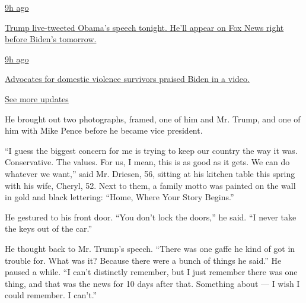 \href{https://www.nytimes3xbfgragh.onion/live/2020/08/19/us/dnc-convention-election?action=click\&pgtype=Article\&state=default\&region=MAIN_CONTENT_1\&context=storylines_live_updates\#trump-live-tweeted-obamas-speech-tonight-hell-appear-on-fox-news-right-before-bidens-tomorrow}{9h
ago}

\href{https://www.nytimes3xbfgragh.onion/live/2020/08/19/us/dnc-convention-election?action=click\&pgtype=Article\&state=default\&region=MAIN_CONTENT_1\&context=storylines_live_updates\#trump-live-tweeted-obamas-speech-tonight-hell-appear-on-fox-news-right-before-bidens-tomorrow}{Trump
live-tweeted Obama's speech tonight. He'll appear on Fox News right
before Biden's tomorrow.}

\href{https://www.nytimes3xbfgragh.onion/live/2020/08/19/us/dnc-convention-election?action=click\&pgtype=Article\&state=default\&region=MAIN_CONTENT_1\&context=storylines_live_updates\#advocates-for-domestic-violence-survivors-praised-biden-in-a-video}{9h
ago}

\href{https://www.nytimes3xbfgragh.onion/live/2020/08/19/us/dnc-convention-election?action=click\&pgtype=Article\&state=default\&region=MAIN_CONTENT_1\&context=storylines_live_updates\#advocates-for-domestic-violence-survivors-praised-biden-in-a-video}{Advocates
for domestic violence survivors praised Biden in a video.}

\href{https://www.nytimes3xbfgragh.onion/live/2020/08/19/us/dnc-convention-election?action=click\&pgtype=Article\&state=default\&region=MAIN_CONTENT_1\&context=storylines_live_updates}{See
more updates}

He brought out two photographs, framed, one of him and Mr. Trump, and
one of him with Mike Pence before he became vice president.

``I guess the biggest concern for me is trying to keep our country the
way it was. Conservative. The values. For us, I mean, this is as good as
it gets. We can do whatever we want,'' said Mr. Driesen, 56, sitting at
his kitchen table this spring with his wife, Cheryl, 52. Next to them, a
family motto was painted on the wall in gold and black lettering:
``Home, Where Your Story Begins.''

He gestured to his front door. ``You don't lock the doors,'' he said.
``I never take the keys out of the car.''

He thought back to Mr. Trump's speech. ``There was one gaffe he kind of
got in trouble for. What was it? Because there were a bunch of things he
said.'' He paused a while. ``I can't distinctly remember, but I just
remember there was one thing, and that was the news for 10 days after
that. Something about --- I wish I could remember. I can't.''


